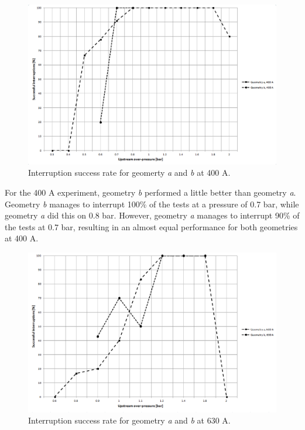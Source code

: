 \documentclass[10pt,a4paper,twoside]{article}
\begin{document}
\begin{figure}[H]
\centering
\includegraphics[scale=0.5]{Bilder/Results/successRate400A.png}
\caption{Interruption success rate for geomerty \textit{a} and \textit{b} at 400 A.} \label{fig:successRate400A}
\end{figure}

For the 400 A experiment, geometry \textit{b} performed a little better than geometry \textit{a}. Geometry \textit{b} manages to interrupt 100\% of the tests at a pressure of 0.7 bar, while geometry \textit{a} did this on 0.8 bar. However, geometry \textit{a} manages to interrupt 90\% of the tests at 0.7 bar, resulting in an almost equal performance for both geometries at 400 A.

\begin{figure}[H]
\centering
\includegraphics[scale=0.5]{Bilder/Results/successRate630A.png}
\caption{Interruption success rate for geometry \textit{a} and \textit{b} at 630 A.} \label{fig:successRate630A}
\end{figure}
\end{document}
